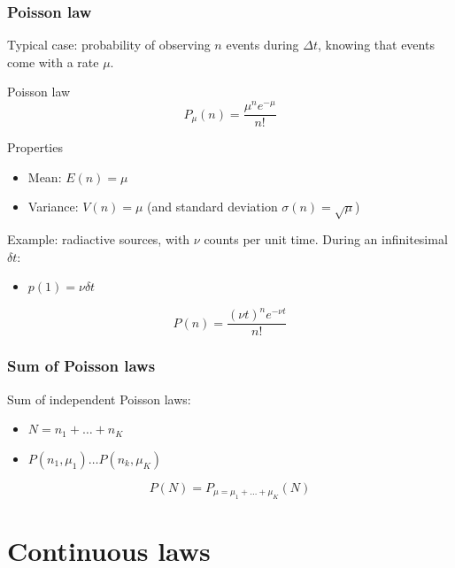 \documentclass[9pt]{beamer}
\newif\ifmynote
\newcommand\mynote[1]{%
\ifmynote \textbf{#1} \else \fi
}
\begin{document}
\begin{frame}
 \frametitle{Poisson law}
 
 \mynote{Écrire au tableau}
 
 Typical case: probability of observing $n$ events during $\Delta t$, knowing that events come with a rate $\mu$. 
 
 \begin{block}{Poisson law}
  $$P_\mu(n) = \frac{\mu^n e^{-\mu}}{n!}$$
 \end{block}
 
 \begin{block}{Properties}
  \begin{itemize}
   \item Mean: $E(n) = \mu$
   \item Variance: $V(n) = \mu$ (and standard deviation $\sigma(n) = \sqrt{\mu}$)
  \end{itemize}
 \end{block}

 Example: radiactive sources, with $\nu$ counts per unit time. During an infinitesimal $\delta t$:
 
 \begin{itemize}
  \item $p(1) = \nu \delta t$ 
 \end{itemize}
 
 $$P(n) = \frac{(\nu t)^n e^{-\nu t}}{n!}$$


\end{frame}

\begin{frame}
 \frametitle{Sum of Poisson laws}
 
 \mynote{Écrire au tableau}
 
 Sum of independent Poisson laws:
 
 \begin{itemize}
  \item $N = n_1 + \dots + n_K$
  \item $P(n_1,\mu_1) \dots P(n_k,\mu_K)$
 \end{itemize}
 
 $$P(N) = P_{\mu = \mu_1 + \dots + \mu_K}(N)$$
 

\end{frame}

\section{Continuous laws}
\end{document}
